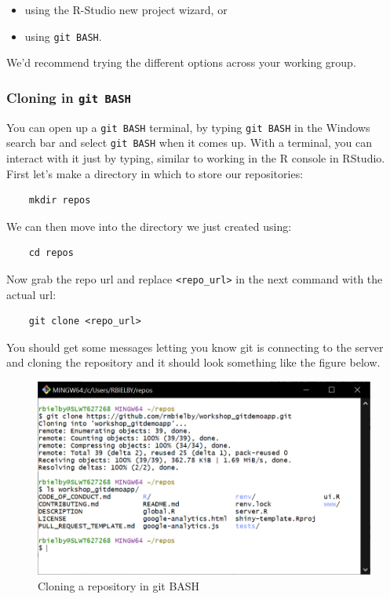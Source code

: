 \documentclass[
  12pt,
]{article}
\providecommand{\tightlist}{%
  \setlength{\itemsep}{0pt}\setlength{\parskip}{0pt}}
\begin{document}
\begin{itemize}
\tightlist
\item
  using the R-Studio new project wizard, or
\item
  using \texttt{git\ BASH}.
\end{itemize}

We'd recommend trying the different options across your working group.

\hypertarget{cloning-in-git-bash}{%
\subsubsection{\texorpdfstring{Cloning in
\texttt{git\ BASH}}{Cloning in git BASH}}\label{cloning-in-git-bash}}

You can open up a \texttt{git\ BASH} terminal, by typing
\texttt{git\ BASH} in the Windows search bar and select
\texttt{git\ BASH} when it comes up. With a terminal, you can interact
with it just by typing, similar to working in the R console in RStudio.
First let's make a directory in which to store our repositories:

\begin{verbatim}
    mkdir repos
\end{verbatim}

We can then move into the directory we just created using:

\begin{verbatim}
    cd repos
\end{verbatim}

Now grab the repo url and replace
\texttt{\textless{}repo\_url\textgreater{}} in the next command with the
actual url:

\begin{verbatim}
    git clone <repo_url>
\end{verbatim}

You should get some messages letting you know git is connecting to the
server and cloning the repository and it should look something like the
figure below.

\begin{figure}
\includegraphics[width=0.6\linewidth]{images/gitdemo/gitdemo-terminal_clone} \caption{Cloning a repository in git BASH}\label{fig:unnamed-chunk-4}
\end{figure}
\end{document}
